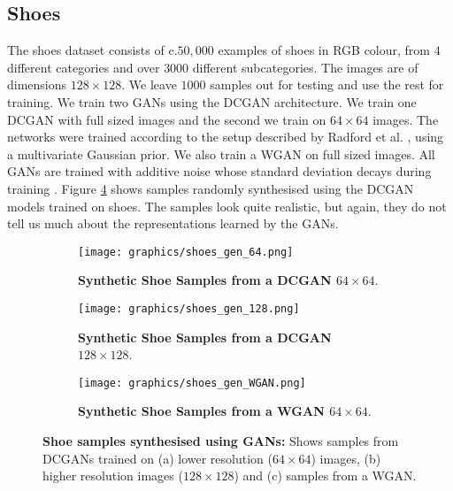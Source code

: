 \documentclass[journal]{IEEEtran}
\begin{document}
\subsection{Shoes}
The shoes dataset \cite{yu2014fine} consists of c.$50,000$ examples of shoes in RGB colour, from $4$ different categories and over $3000$ different subcategories. The images are of dimensions $128\times128$. We leave $1000$ samples out for testing and use the rest for training. We train two GANs using the DCGAN \cite{radford2015unsupervised} architecture. We train one DCGAN with full sized images and the second we train on $64\times64$ images. The networks were trained according to the setup described by Radford et al. \cite{radford2015unsupervised}, using a multivariate Gaussian prior. We also train a WGAN \cite{arjovsky2017wasserstein} on full sized images. All GANs are trained with additive noise whose standard deviation decays during training \cite{arjovsky2017towards}. Figure \ref{fig:shoe_gen} shows samples randomly synthesised using the DCGAN models trained on shoes. The samples look quite realistic, but again, they do not tell us much about the representations learned by the GANs.

\begin{figure}
\begin{subfigure}{\columnwidth}
    \centering
    \texttt{[image: graphics/shoes\_gen\_64.png]}
    \caption{\textbf{Synthetic Shoe Samples from a DCGAN $64\times64$}.}
    \label{fig:my_label}
\end{subfigure}
\begin{subfigure}{\columnwidth}
    \centering
    \texttt{[image: graphics/shoes\_gen\_128.png]}
    \caption{\textbf{Synthetic Shoe Samples from a DCGAN $128\times128$}.}
    \label{fig:my_label}
\end{subfigure}
\begin{subfigure}{\columnwidth}
    \centering
    \texttt{[image: graphics/shoes\_gen\_WGAN.png]} %
    \caption{\textbf{Synthetic Shoe Samples from a WGAN $64\times64$}.}
    \label{fig:my_label}
\end{subfigure}
\caption{\textbf{Shoe samples synthesised using GANs:} Shows samples from DCGANs trained on  (a) lower resolution ($64\times64$) images, (b) higher resolution images ($128\times128$) and (c) samples from a WGAN. }
\label{fig:shoe_gen}
\end{figure}
\end{document}
